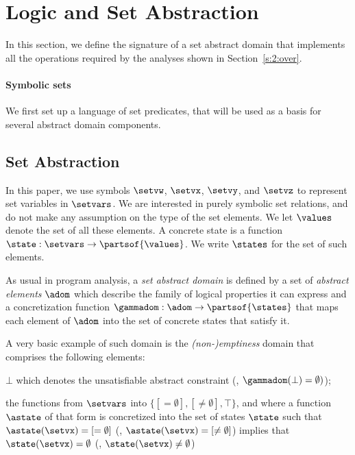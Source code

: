 \section{Logic and Set Abstraction}
\label{sec:logic-and-set-abstraction}
In this section, we define the signature of a set abstract domain that
implements all the operations required by the analyses shown in
Section~\ref{s:2:over}.

\paragraph{Symbolic sets}
We first set up a language of set predicates, that will be used as a
basis for several abstract domain components.

\subsection{Set Abstraction}
\label{s:3:1:abs}
In this paper, we use symbols $\setvw$, $\setvx$, $\setvy$, and $\setvz$
to represent set variables in $\setvars$.
We are interested in purely symbolic set relations, and do not make any
assumption on the type of the set elements.
We let \( \values \) denote the set of all these elements.
A concrete state is a function \( \state: \setvars \rightarrow
\partsof{\values} \).
We write \( \states \) for the set of such elements.

As usual in program analysis, a {\em set abstract domain} is defined by a
set of {\em abstract elements} \( \adom \) which describe the family of
logical properties it can express and a concretization function
\( \gammadom: \adom \rightarrow \partsof{\states} \) that maps each
element of \( \adom \) into the set of concrete states that satisfy it.
\begin{example}
  \label{ex:1:mt}
  A very basic example of such domain is the {\em (non-)emptiness} domain
  that comprises the following elements:
  \begin{compactitem}
  \item \( \bot \) which denotes the unsatisfiable abstract constraint
    (\ie, \( \gammadom( \bot ) = \emptyset ) \));
  \item the functions from \( \setvars \) into \( \{ [=\emptyset],
    [\not=\emptyset], \top \} \), and where a function \( \astate \) of
    that form is concretized into the set of states \( \state \) such that
    \( \astate( \setvx ) = [=\emptyset] \) (\resp, \( \astate( \setvx ) =
    [\not=\emptyset] \)) implies that \( \state( \setvx ) = \emptyset \)
    (\resp, \( \state( \setvx ) \not= \emptyset \))
  \end{compactitem}
\end{example}

